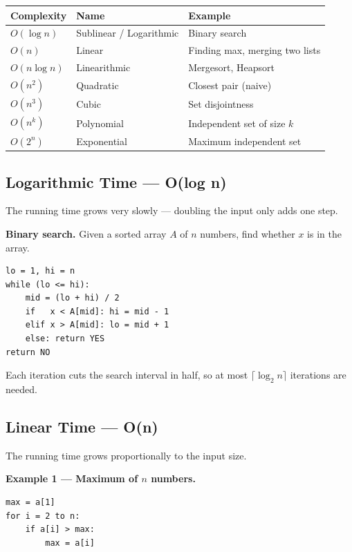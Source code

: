 \documentclass[12pt,a4paper]{report}
\begin{document}
\begin{center}
\begin{tabular}{@{}lll@{}}
\toprule
\textbf{Complexity} & \textbf{Name} & \textbf{Example} \\
\midrule
$O(\log n)$   & Sublinear / Logarithmic & Binary search \\
$O(n)$        & Linear                  & Finding max, merging two lists \\
$O(n \log n)$ & Linearithmic            & Mergesort, Heapsort \\
$O(n^2)$      & Quadratic               & Closest pair (naive) \\
$O(n^3)$      & Cubic                   & Set disjointness \\
$O(n^k)$      & Polynomial              & Independent set of size $k$ \\
$O(2^n)$      & Exponential             & Maximum independent set \\
\bottomrule
\end{tabular}
\end{center}

\subsection{Logarithmic Time — O(log n)}

The running time grows very slowly — doubling the input only adds one step.

\textbf{Binary search.} Given a sorted array $A$ of $n$ numbers, find whether $x$ is
in the array.

\begin{Verbatim}[frame=single]
lo = 1, hi = n
while (lo <= hi):
    mid = (lo + hi) / 2
    if   x < A[mid]: hi = mid - 1
    elif x > A[mid]: lo = mid + 1
    else: return YES
return NO
\end{Verbatim}

Each iteration cuts the search interval in half, so at most $\lceil \log_2 n \rceil$
iterations are needed.

\subsection{Linear Time — O(n)}

The running time grows proportionally to the input size.

\textbf{Example 1 — Maximum of $n$ numbers.}
\begin{Verbatim}[frame=single]
max = a[1]
for i = 2 to n:
    if a[i] > max:
        max = a[i]
\end{Verbatim}
\end{document}
